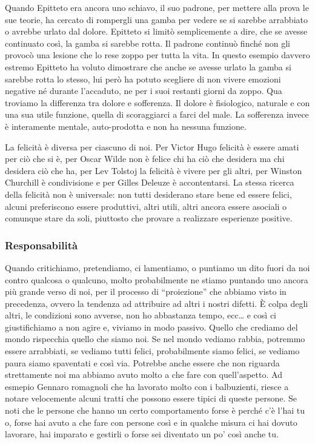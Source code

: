 \documentclass[12pt]{book} %
\begin{document}
Quando Epitteto era ancora uno schiavo, il suo padrone, per mettere alla prova le sue teorie, ha cercato di rompergli
una gamba per vedere se si sarebbe arrabbiato o avrebbe urlato dal dolore. Epitteto si limitò semplicemente a dire, che
se avesse continuato così, la gamba si sarebbe rotta. Il padrone continuò finché non gli provocò una lesione che lo
rese zoppo per tutta la vita. In questo esempio davvero estremo Epitteto ha voluto dimostrare che anche se avesse
urlato la gamba si sarebbe rotta lo stesso, lui però ha potuto scegliere di non vivere emozioni negative né durante
l'accaduto, ne per i suoi restanti giorni da zoppo. Qua troviamo la differenza tra dolore e
sofferenza. Il dolore è fisiologico, naturale e con una sua utile funzione, quella di scoraggiarci a farci del male. La
sofferenza invece è interamente mentale, auto-prodotta e non ha nessuna funzione.

La felicità è diversa per ciascuno di noi. Per Victor Hugo felicità è essere amati per ciò che si è, per Oscar Wilde non
è felice chi ha ciò che desidera ma chi desidera ciò che ha, per Lev Tolstoj la felicità è vivere per gli altri, per
Winston Churchill è condivisione e per Gilles Deleuze è accontentarsi. La stessa ricerca della felicità non è
universale: non tutti desiderano stare bene ed essere felici, alcuni preferiscono essere produttivi, altri utili, altri
ancora essere asociali o comunque stare da soli, piuttosto che provare a realizzare esperienze
positive.

\subsubsection{Responsabilità}
Quando critichiamo, pretendiamo, ci
lamentiamo, o puntiamo un dito fuori da noi contro qualcosa o qualcuno, molto probabilmente ne stiamo puntando uno
ancora più grande verso di noi, per il processo di “proiezione” che abbiamo visto in precedenza, ovvero la tendenza ad
attribuire ad altri i nostri difetti. È colpa degli altri, le condizioni sono avverse, non ho abbastanza tempo, ecc… e
così ci giustifichiamo a non agire e, viviamo in modo passivo. Quello che crediamo del mondo rispecchia quello che
siamo noi. Se nel mondo vediamo rabbia, potremmo essere arrabbiati, se vediamo tutti felici, probabilmente siamo
felici, se vediamo paura siamo spaventati e così via. Potrebbe anche essere che non riguarda strettamente noi ma abbiamo avuto molto a che fare con quell'aspetto. Ad esmepio Gennaro romagnoli che ha lavorato molto con i balbuzienti, riesce a notare velocemente alcuni tratti che possono essere tipici di queste persone. Se noti che le persone che hanno un certo comportamento forse è perché c'è l'hai tu o, forse hai avuto a che fare con persone così e in qualche misura ci hai dovuto lavorare, hai imparato e gestirli o forse sei diventato un po' così anche tu.
\end{document}
